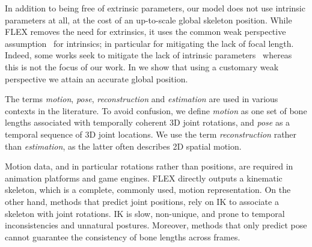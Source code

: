 In addition to being free of extrinsic parameters, our model does not use intrinsic parameters at all, at the cost of an up-to-scale global skeleton position. While FLEX removes the need for extrinsics, it uses the common weak perspective assumption~\cite{kissos2020weak} for intrinsics; in particular for mitigating the lack of focal length. Indeed, some works seek to mitigate the lack of intrinsic parameters~\cite{shimada2021neural,habermann2020deepcap,kissos2020weak} whereas this is not the focus of our work.
 In  we show that using a customary weak perspective we attain an accurate global position.


The terms \emph{motion}, \emph{pose}, \emph{reconstruction} and \emph{estimation} are used in various contexts in the literature. To avoid confusion, we define \emph{motion} as one set of bone lengths associated with temporally coherent 3D joint rotations, and \emph{pose} as a temporal sequence of 3D joint locations.
We use the term \emph{reconstruction} rather than \emph{estimation}, as the latter often describes 2D spatial motion. 

Motion data, and in particular rotations rather than positions, are required in animation platforms and game engines.
FLEX directly outputs a kinematic skeleton, which is a complete, commonly used, motion representation. 
On the other hand, methods that predict joint positions, rely on IK to associate a skeleton with joint rotations. 
IK is slow, non-unique, and prone to temporal inconsistencies and unnatural postures.
Moreover, methods that only predict pose cannot guarantee the consistency of bone lengths across frames.




